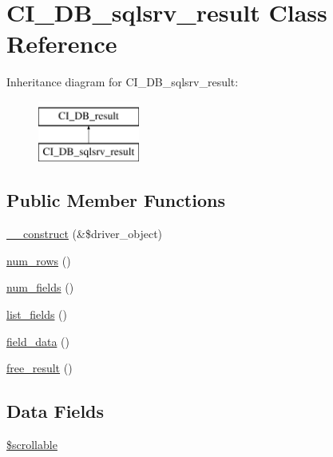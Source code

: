 \hypertarget{class_c_i___d_b__sqlsrv__result}{}\section{C\+I\+\_\+\+D\+B\+\_\+sqlsrv\+\_\+result Class Reference}
\label{class_c_i___d_b__sqlsrv__result}
Inheritance diagram for C\+I\+\_\+\+D\+B\+\_\+sqlsrv\+\_\+result\+:\begin{figure}[H]
\begin{center}
\leavevmode
\includegraphics[height=2.000000cm]{class_c_i___d_b__sqlsrv__result}
\end{center}
\end{figure}
\subsection*{Public Member Functions}
\begin{DoxyCompactItemize}
\item 
\hyperlink{class_c_i___d_b__sqlsrv__result_a8e093c8b6e5733bc3f306385ee426ab7}{\+\_\+\+\_\+construct} (\&\$driver\+\_\+object)
\item 
\hyperlink{class_c_i___d_b__sqlsrv__result_a218657c303ee499b97710ab0cd2f5d6e}{num\+\_\+rows} ()
\item 
\hyperlink{class_c_i___d_b__sqlsrv__result_af831bf363e4d7d661a717a4932af449d}{num\+\_\+fields} ()
\item 
\hyperlink{class_c_i___d_b__sqlsrv__result_a50b54eb4ea7cfd039740f532988ea776}{list\+\_\+fields} ()
\item 
\hyperlink{class_c_i___d_b__sqlsrv__result_a84bffd65e53902ade1591716749a33e3}{field\+\_\+data} ()
\item 
\hyperlink{class_c_i___d_b__sqlsrv__result_aad2d98d6beb3d6095405356c6107b473}{free\+\_\+result} ()
\end{DoxyCompactItemize}
\subsection*{Data Fields}
\begin{DoxyCompactItemize}
\item 
\hyperlink{class_c_i___d_b__sqlsrv__result_a76095eacf021915db9aabc44ecf58555}{\$scrollable}
\end{DoxyCompactItemize}
